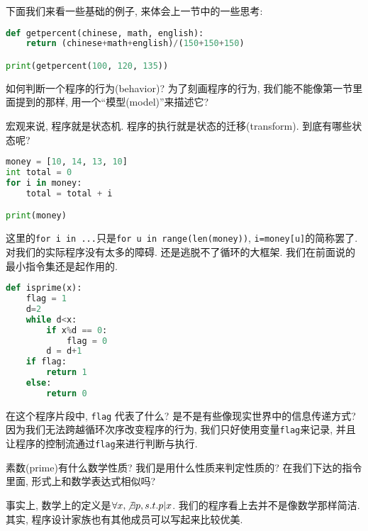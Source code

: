 下面我们来看一些基础的例子, 来体会上一节中的一些思考: 


\begin{lstlisting}[language=Python]
def getpercent(chinese, math, english): 
    return (chinese+math+english)/(150+150+150)

print(getpercent(100, 120, 135))
\end{lstlisting}

\begin{bonus}
如何判断一个程序的行为(behavior)? 为了刻画程序的行为, 我们能不能像第一节里面提到的那样, 用一个``模型(model)''来描述它?

宏观来说, 程序就是状态机. 程序的执行就是状态的迁移(transform). 到底有哪些状态呢?
\end{bonus}


\begin{lstlisting}[language=Python]
money = [10, 14, 13, 10]
int total = 0
for i in money: 
    total = total + i

print(money)
\end{lstlisting}

这里的\texttt{for i in ...}只是\texttt{for u in range(len(money))}, \texttt{i=money[u]}的简称罢了. 对我们的实际程序没有太多的障碍. 还是逃脱不了循环的大框架. 我们在前面说的最小指令集还是起作用的. 


\begin{lstlisting}[language=Python]
def isprime(x): 
    flag = 1 
    d=2
    while d<x:
        if x%d == 0: 
            flag = 0
        d = d+1
    if flag: 
        return 1
    else: 
        return 0
\end{lstlisting}

在这个程序片段中, \texttt{flag} 代表了什么? 是不是有些像现实世界中的信息传递方式? 因为我们无法跨越循环次序改变程序的行为, 我们只好使用变量\texttt{flag}来记录, 并且让程序的控制流通过\texttt{flag}来进行判断与执行. 

\begin{bonus}
	素数(prime)有什么数学性质? 我们是用什么性质来判定性质的? 在我们下达的指令里面, 形式上和数学表达式相似吗? 
\end{bonus}

事实上, 数学上的定义是$\forall x, \not \exists p, s.t. p|x$. 我们的程序看上去并不是像数学那样简洁. 其实, 程序设计家族也有其他成员可以写起来比较优美. 

